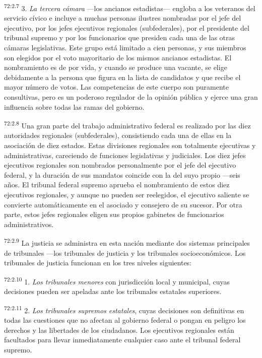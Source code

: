 \par
\textsuperscript{72:2.7} 3. \textit{La tercera cámara} ---los ancianos estadistas--- engloba a los veteranos del servicio cívico e incluye a muchas personas ilustres nombradas por el jefe del ejecutivo, por los jefes ejecutivos regionales (subfederales), por el presidente del tribunal supremo y por los funcionarios que presiden cada una de las otras cámaras legislativas. Este grupo está limitado a cien personas, y sus miembros son elegidos por el voto mayoritario de los mismos ancianos estadistas. El nombramiento es de por vida, y cuando se produce una vacante, se elige debidamente a la persona que figura en la lista de candidatos y que recibe el mayor número de votos. Las competencias de este cuerpo son puramente consultivas, pero es un poderoso regulador de la opinión pública y ejerce una gran influencia sobre todas las ramas del gobierno.

\par
\textsuperscript{72:2.8} Una gran parte del trabajo administrativo federal es realizado por las diez autoridades regionales (subfederales), consistiendo cada una de ellas en la asociación de diez estados. Estas divisiones regionales son totalmente ejecutivas y administrativas, careciendo de funciones legislativas y judiciales. Los diez jefes ejecutivos regionales son nombrados personalmente por el jefe del ejecutivo federal, y la duración de sus mandatos coincide con la del suyo propio ---seis años. El tribunal federal supremo aprueba el nombramiento de estos diez ejecutivos regionales, y aunque no pueden ser reelegidos, el ejecutivo saliente se convierte automáticamente en el asociado y consejero de su sucesor. Por otra parte, estos jefes regionales eligen sus propios gabinetes de funcionarios administrativos.

\par
\textsuperscript{72:2.9} La justicia se administra en esta nación mediante dos sistemas principales de tribunales ---los tribunales de justicia y los tribunales socioeconómicos. Los tribunales de justicia funcionan en los tres niveles siguientes:

\par
\textsuperscript{72:2.10} 1. \textit{Los tribunales menores} con jurisdicción local y municipal, cuyas decisiones pueden ser apeladas ante los tribunales estatales superiores.

\par
\textsuperscript{72:2.11} 2. \textit{Los tribunales supremos estatales}, cuyas decisiones son definitivas en todas las cuestiones que no afectan al gobierno federal o pongan en peligro los derechos y las libertades de los ciudadanos. Los ejecutivos regionales están facultados para llevar inmediatamente cualquier caso ante el tribunal federal supremo.

